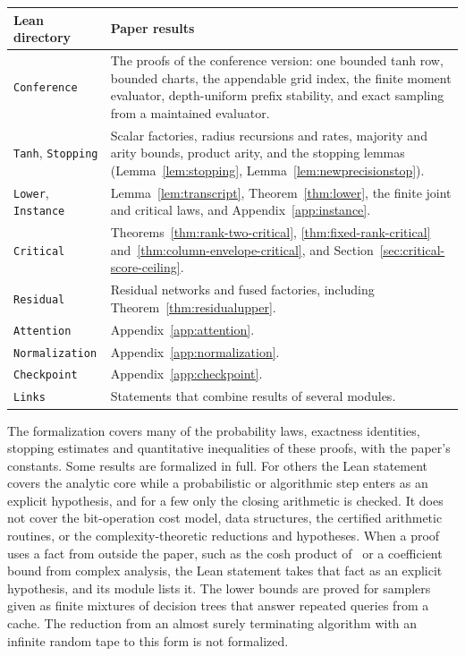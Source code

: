 \begin{center}
\small
\begin{tabularx}{\textwidth}{@{}>{\raggedright\arraybackslash}p{}Y@{}}
\toprule
Lean directory & Paper results\\
\midrule
\texttt{Conference} & The proofs of the conference version: one bounded
tanh row, bounded charts, the appendable grid index, the finite moment
evaluator, depth-uniform prefix stability, and exact sampling from a
maintained evaluator.\\
\texttt{Tanh}, \texttt{Stopping} & Scalar factories, radius recursions and
rates, majority and arity bounds, product arity, and the stopping lemmas
(Lemma~\ref{lem:stopping}, Lemma~\ref{lem:newprecisionstop}).\\
\texttt{Lower}, \texttt{Instance} & Lemma~\ref{lem:transcript},
Theorem~\ref{thm:lower}, the finite joint and critical laws, and
Appendix~\ref{app:instance}.\\
\texttt{Critical} & Theorems~\ref{thm:rank-two-critical},
\ref{thm:fixed-rank-critical} and~\ref{thm:column-envelope-critical}, and
Section~\ref{sec:critical-score-ceiling}.\\
\texttt{Residual} & Residual networks and fused factories, including
Theorem~\ref{thm:residualupper}.\\
\texttt{Attention} & Appendix~\ref{app:attention}.\\
\texttt{Normalization} & Appendix~\ref{app:normalization}.\\
\texttt{Checkpoint} & Appendix~\ref{app:checkpoint}.\\
\texttt{Links} & Statements that combine results of several modules.\\
\bottomrule
\end{tabularx}
\end{center}

The formalization covers many of the probability laws, exactness
identities, stopping estimates and quantitative inequalities of these proofs,
with the paper's constants. Some results are formalized in full. For others
the Lean statement covers the analytic core while a probabilistic or
algorithmic step enters as an explicit hypothesis, and for a few only the
closing arithmetic is checked. It does not cover the bit-operation cost model, data
structures, the certified arithmetic routines, or the complexity-theoretic
reductions and hypotheses. When a proof uses a fact from outside the paper,
such as the cosh product of~\cite{dlmf} or a coefficient bound from complex
analysis, the Lean statement takes that fact as an explicit hypothesis, and
its module lists it. The lower bounds are proved for samplers given as
finite mixtures of decision trees that answer repeated queries from a cache.
The reduction from an almost surely terminating algorithm with an infinite
random tape to this form is not formalized.
